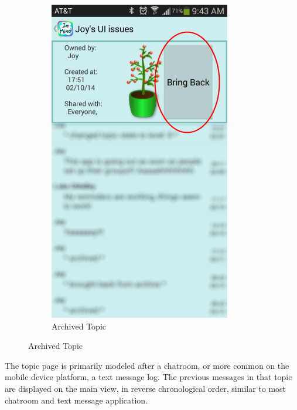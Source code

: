 \begin{figure}
\begin{subfigure}[b]{0.3\textwidth}
        \includegraphics[width=\textwidth]{topic_view_archived.png}
        \caption{Archived Topic}
      \end{subfigure}
      \label{fig:topic_view}
    \end{figure}

      The topic page is primarily modeled after a chatroom,
      or more common on the mobile device platform,
      a text message log.
      The previous messages in that topic are displayed on the main view,
      in reverse chronological order, similar to most chatroom and text message application.

